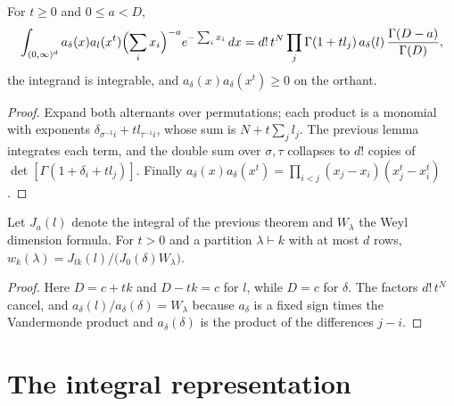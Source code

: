 \begin{theorem}
    \label{thm:gamma_integral}
    \leanok
    For $t\ge0$ and $0\le a<D$,
    \[
        \int_{(0,\infty)^d}a_\delta(x)a_l(x^t)\Bigl(\sum_ix_i\Bigr)^{-a}e^{-\sum_ix_i}\,dx
        =d!\,t^N\prod_j\Gamma(1+tl_j)\,a_\delta(l)\,\frac{\Gamma(D-a)}{\Gamma(D)},
    \]
    the integrand is integrable, and $a_\delta(x)a_\delta(x^t)\ge0$ on the orthant.
\end{theorem}

\begin{proof}\leanok
    Expand both alternants over permutations; each product is a monomial with exponents
    $\delta_{\sigma^{-1}i}+tl_{\tau^{-1}i}$, whose sum is $N+t\sum_jl_j$. The previous lemma
    integrates each term, and the double sum over $\sigma,\tau$ collapses to $d!$ copies of
    $\det[\Gamma(1+\delta_i+tl_j)]$. Finally
    $a_\delta(x)a_\delta(x^t)=\prod_{i<j}(x_j-x_i)(x_j^t-x_i^t)$.
\end{proof}

\begin{theorem}
    \label{thm:replica_weight_gamma}
    \leanok
    Let $J_a(l)$ denote the integral of the previous theorem and $W_\lambda$ the Weyl dimension
    formula. For $t>0$ and a partition $\lambda\vdash k$ with at most $d$ rows,
    $w_k(\lambda)=J_{tk}(l)/\bigl(J_0(\delta)W_\lambda\bigr)$.
\end{theorem}

\begin{proof}\leanok
    Here $D=c+tk$ and $D-tk=c$ for $l$, while $D=c$ for $\delta$. The factors $d!\,t^N$ cancel,
    and $a_\delta(l)/a_\delta(\delta)=W_\lambda$ because $a_\delta$ is a fixed sign times the
    Vandermonde product and $a_\delta(\delta)$ is the product of the differences $j-i$.
\end{proof}

\section{The integral representation}

